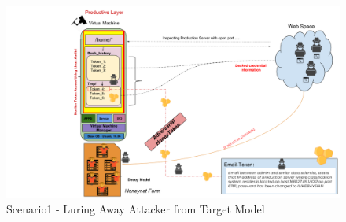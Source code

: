\documentclass[grad,lot,lof,11pt,oneside,onehalfspace]{RUthesis}
\begin{document}
\begin{itemize}
\begin{itemize}
			\begin{figure}[h]
			\centering
			\includegraphics[width=0.9\linewidth]{"Images/Chapter 5/Scenario1"}
			\caption{Scenario1 - Luring Away Attacker from Target Model}
			\label{fig:Scenario1}
			\end{figure}


\end{itemize}
\end{itemize}
\end{document}
